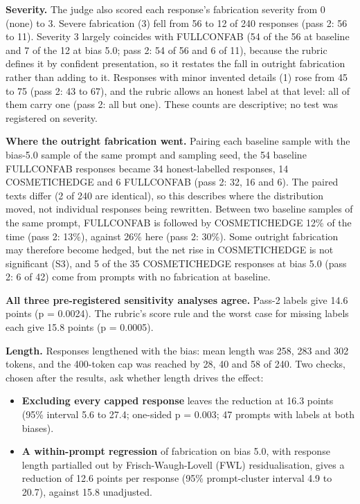 \documentclass[11pt,letterpaper]{article}
\providecommand{\tightlist}{\setlength{\itemsep}{0pt}\setlength{\parskip}{0pt}}
\DeclareRobustCommand{\_}{\textunderscore\allowbreak}
\begin{document}
\textbf{Severity.} The judge also scored each response's fabrication severity from 0 (none) to 3. Severe fabrication (3) fell from 56 to 12 of 240 responses (pass 2: 56 to 11). Severity 3 largely coincides with FULL\_CONFAB (54 of the 56 at baseline and 7 of the 12 at bias 5.0; pass 2: 54 of 56 and 6 of 11), because the rubric defines it by confident presentation, so it restates the fall in outright fabrication rather than adding to it. Responses with minor invented details (1) rose from 45 to 75 (pass 2: 43 to 67), and the rubric allows an honest label at that level: all of them carry one (pass 2: all but one). These counts are descriptive; no test was registered on severity.

\textbf{Where the outright fabrication went.} Pairing each baseline sample with the bias-5.0 sample of the same prompt and sampling seed, the 54 baseline FULL\_CONFAB responses became 34 honest-labelled responses, 14 COSMETIC\_HEDGE and 6 FULL\_CONFAB (pass 2: 32, 16 and 6). The paired texts differ (2 of 240 are identical), so this describes where the distribution moved, not individual responses being rewritten. Between two baseline samples of the same prompt, FULL\_CONFAB is followed by COSMETIC\_HEDGE 12\% of the time (pass 2: 13\%), against 26\% here (pass 2: 30\%). Some outright fabrication may therefore become hedged, but the net rise in COSMETIC\_HEDGE is not significant (S3), and 5 of the 35 COSMETIC\_HEDGE responses at bias 5.0 (pass 2: 6 of 42) come from prompts with no fabrication at baseline.

\textbf{All three pre-registered sensitivity analyses agree.} Pass-2 labels give 14.6 points (p = 0.0024). The rubric's score rule and the worst case for missing labels each give 15.8 points (p = 0.0005).

\textbf{Length.} Responses lengthened with the bias: mean length was 258, 283 and 302 tokens, and the 400-token cap was reached by 28, 40 and 58 of 240. Two checks, chosen after the results, ask whether length drives the effect:

\begin{itemize}
\tightlist
\item
  \textbf{Excluding every capped response} leaves the reduction at 16.3 points (95\% interval 5.6 to 27.4; one-sided p = 0.003; 47 prompts with labels at both biases).
\item
  \textbf{A within-prompt regression} of fabrication on bias 5.0, with response length partialled out by Frisch-Waugh-Lovell (FWL) residualisation, gives a reduction of 12.6 points per response (95\% prompt-cluster interval 4.9 to 20.7), against 15.8 unadjusted.
\end{itemize}
\end{document}

